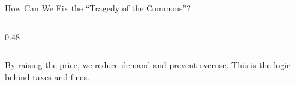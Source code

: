 \documentclass[9pt,english,aspectratio=169]{beamer}
\begin{document}
\begin{frame}{How Can We Fix the ``Tragedy of the Commons''?}
\begin{columns}[c]
\begin{column}{0.48\textwidth}
    \end{column}
  \end{columns}

  \pause
  \vspace{0.3em}
  \begin{insightbox}
    By raising the price, we reduce demand and prevent overuse.
    This is the logic behind taxes and fines.
  \end{insightbox}

\end{frame}





\end{document}
